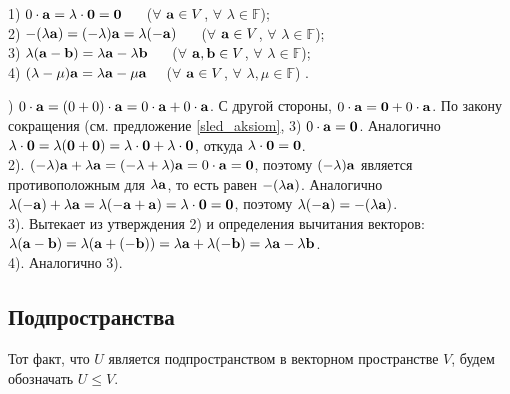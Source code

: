 \begin{predl}\label{sled_aksiom1}
1) $0\cdot \mathbf{a}  = \lambda \cdot \mathbf{0}= \mathbf{0}$ \,\,\,\,\,\, ($\forall$ $\mathbf{a}\in V$, $\forall$ $\lambda\in \mathbb{F}$);\\
2) $-(\lambda \mathbf{a})=(-\lambda )\mathbf{a} = \lambda (-\mathbf{a})$ \,\,\,\,\,\, ($\forall$ $\mathbf{a}\in V$, $\forall$ $\lambda\in \mathbb{F}$);\\
3)  $\lambda(\mathbf{a}-\mathbf{b}) = \lambda \mathbf{a}- \lambda \mathbf{b}$ \,\,\,\,\,\, ($\forall$ $\mathbf{a}, \mathbf{b}\in V$, $\forall$ $\lambda\in \mathbb{F}$);\\
4)  $(\lambda - \mu) \mathbf{a} = \lambda \mathbf{a}- \mu \mathbf{a}$\,\,\,\,\,\, ($\forall$ $\mathbf{a} \in V$, $\forall$ $\lambda , \mu \in \mathbb{F}$) .
\end{predl}
)  $0\cdot \mathbf{a} = (0+0)\cdot \mathbf{a} = 0\cdot \mathbf{a} + 0\cdot \mathbf{a}$. 
С другой стороны, $0\cdot \mathbf{a} =\mathbf{0}+0\cdot \mathbf{a}$. По закону сокращения 
(см. предложение \ref{sled_aksiom}, 3) $0\cdot \mathbf{a}=\mathbf{0}$.
Аналогично 
$\lambda \cdot \mathbf{0} = \lambda (\mathbf{0}+\mathbf{0}) = \lambda \cdot \mathbf{0} + \lambda \cdot \mathbf{0}$, откуда $\lambda \cdot \mathbf{0}=\mathbf{0}$.
\\
2). $(-\lambda )\mathbf{a} + \lambda \mathbf{a} = (-\lambda  + \lambda) \mathbf{a} = 0\cdot \mathbf{a}  = \mathbf{0}$, поэтому 
$(-\lambda )\mathbf{a}$ является противоположным для $\lambda \mathbf{a}$, то есть равен $-(\lambda \mathbf{a})$.
Аналогично 
$\lambda (-\mathbf{a}) + \lambda \mathbf{a} = \lambda (-\mathbf{a}+ \mathbf{a}) = \lambda \cdot \mathbf{0}  = \mathbf{0}$, поэтому 
$\lambda (-\mathbf{a}) = -(\lambda \mathbf{a})$.
\\
3). Вытекает из утверждения 2) и определения вычитания векторов: 
$\lambda(\mathbf{a}-\mathbf{b}) = \lambda(\mathbf{a}+(-\mathbf{b})) = \lambda \mathbf{a}+ \lambda (-\mathbf{b}) =   \lambda \mathbf{a}- \lambda \mathbf{b}$.
\\
4). Аналогично 3).
\edok


\subsection{Подпространства}


Тот факт, что $U$ является подпространством в векторном пространстве $V$, будем обозначать $U\leq V$.

